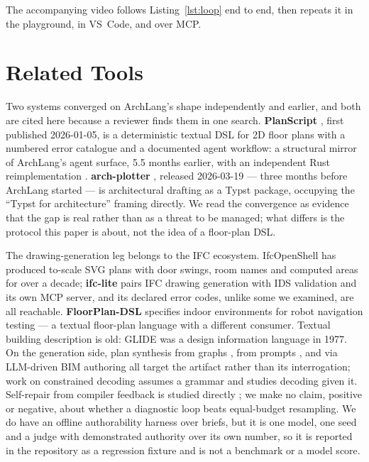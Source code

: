 \documentclass[10pt,conference]{IEEEtran}
\begin{document}
The accompanying video follows Listing~\ref{lst:loop} end to end, then repeats it in
the playground, in VS~Code, and over MCP.

\section{Related Tools}

Two systems converged on ArchLang's shape independently and earlier, and both are
cited here because a reviewer finds them in one search. \textbf{PlanScript}
\cite{planscript_ts}, first published 2026-01-05, is a deterministic textual DSL for
2D floor plans with a numbered error catalogue and a documented agent workflow: a
structural mirror of ArchLang's agent surface, 5.5 months earlier, with an independent
Rust reimplementation \cite{planscript_rust}. \textbf{arch-plotter}
\cite{archplotter}, released 2026-03-19 --- three months before ArchLang started ---
is architectural drafting as a Typst package, occupying the ``Typst for
architecture'' framing directly. We read the convergence as evidence that
the gap is real rather than as a threat to be managed; what differs is the protocol
this paper is about, not the idea of a floor-plan DSL.

The drawing-generation leg belongs to the IFC ecosystem. IfcOpenShell
\cite{ifcopenshell} has produced to-scale SVG plans with door swings, room names and
computed areas for over a decade; \textbf{ifc-lite} \cite{ifclite} pairs IFC drawing
generation with IDS validation and its own MCP server, and its declared error codes,
unlike some we examined, are all reachable. \textbf{FloorPlan-DSL}
\cite{parra2023floorplandsl} specifies indoor environments for robot
navigation testing --- a textual floor-plan language with a different consumer.
Textual building description is old: GLIDE \cite{eastman1977glide} was a design
information language in 1977. On the generation side, plan synthesis from graphs
\cite{nauata2020housegan}, from prompts \cite{galanos2023architext}, and via
LLM-driven BIM authoring \cite{du2026text2bim} all target the artifact
rather than its interrogation; work on constrained decoding \cite{park2024gad} assumes
a grammar and studies decoding given it. Self-repair from compiler feedback is
studied directly
\cite{olausson2024selfrepair}; we make no claim, positive
or negative, about whether a diagnostic loop beats equal-budget resampling. We do have
an offline authorability harness over \factEvalBriefs{} briefs, but it is one model,
one seed and a judge with demonstrated authority over its own number, so it is
reported in the repository as a regression fixture and is not a benchmark or a model
score.
\end{document}
